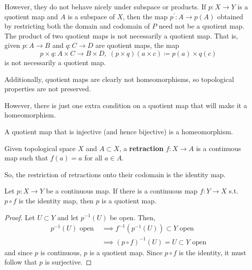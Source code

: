   However, they do not behave nicely under subspace or products. If $p: X \rightarrow Y$ is a quotient map and $A$ is a subspace of $X$, then the map $p^\prime: A \rightarrow p(A)$ obtained by restricting both the domain and codomain of $P$ need not be a quotient map. The product of two quotient maps is not necessarily a quotient map. That is, given $p: A \rightarrow B$ and $q: C \rightarrow D$ are quotient maps, the map 
  \begin{equation}
    p \times q: A \times C \rightarrow B \times D, \; (p \times q) (a \times c) \coloneqq p(a) \times q(c)
  \end{equation}
  is not necessarily a quotient map. 

  \begin{example}
    
  \end{example}

  \begin{example}
    
  \end{example}

  Additionally, quotient maps are clearly not homeomorphisms, so topological properties are not preserved. 

  \begin{example}[]
    
  \end{example}

  However, there is just one extra condition on a quotient map that will make it a homeomorphism.  

  \begin{lemma}
    A quotient map that is injective (and hence bijective) is a homeomorphism. 
  \end{lemma} 

  \begin{definition}[Retraction]
    Given topological space $X$ and $A \subset X$, a \textbf{retraction} $f: X \to A$ is a continuous map such that $f(a) = a$ for all $a \in A$. 
  \end{definition}

  So, the restriction of retractions onto their codomain is the identity map. 

  \begin{lemma} 
    Let $p: X \to Y$ be a continuous map. If there is a continuous map $f: Y \to X$ s.t. $p \circ f$ is the identity map, then $p$ is a quotient map. 
  \end{lemma}
  \begin{proof}
    Let $U \subset Y$ and let $p^{-1} (U)$ be open. Then, 
    \begin{align}
      p^{-1} (U) \text{ open } & \implies f^{-1} (p^{-1} (U)) \subset Y \text{ open} \\ 
                               & \implies (p \circ f)^{-1}(U) = U \subset Y \text{ open}
    \end{align}
    and since $p$ is continuous, $p$ is a quotient map. Since $p \circ f$ is the identity, it must follow that $p$ is surjective. 
  \end{proof}

